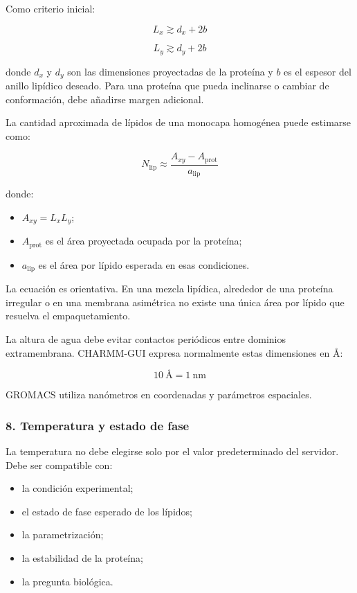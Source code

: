 \documentclass[
  spanish,
  11pt,
  a4paper]{article}
\providecommand{\tightlist}{%
  \setlength{\itemsep}{0pt}\setlength{\parskip}{0pt}}
\begin{document}
Como criterio inicial:

\[
L_x \gtrsim d_x + 2b
\]

\[
L_y \gtrsim d_y + 2b
\]

donde \(d_x\) y \(d_y\) son las dimensiones proyectadas de la proteína y
\(b\) es el espesor del anillo lipídico deseado. Para una proteína que
pueda inclinarse o cambiar de conformación, debe añadirse margen
adicional.

La cantidad aproximada de lípidos de una monocapa homogénea puede
estimarse como:

\[
N_{\mathrm{lip}} \approx
\frac{A_{xy}-A_{\mathrm{prot}}}
     {a_{\mathrm{lip}}}
\]

donde:

\begin{itemize}
\tightlist
\item
  \(A_{xy}=L_xL_y\);
\item
  \(A_{\mathrm{prot}}\) es el área proyectada ocupada por la proteína;
\item
  \(a_{\mathrm{lip}}\) es el área por lípido esperada en esas
  condiciones.
\end{itemize}

La ecuación es orientativa. En una mezcla lipídica, alrededor de una
proteína irregular o en una membrana asimétrica no existe una única área
por lípido que resuelva el empaquetamiento.

La altura de agua debe evitar contactos periódicos entre dominios
extramembrana. CHARMM-GUI expresa normalmente estas dimensiones en Å:

\[
10\ \text{Å}=1\ \text{nm}
\]

GROMACS utiliza nanómetros en coordenadas y parámetros espaciales.

\subsubsection{8. Temperatura y estado de
fase}\label{temperatura-y-estado-de-fase}

La temperatura no debe elegirse solo por el valor predeterminado del
servidor. Debe ser compatible con:

\begin{itemize}
\tightlist
\item
  la condición experimental;
\item
  el estado de fase esperado de los lípidos;
\item
  la parametrización;
\item
  la estabilidad de la proteína;
\item
  la pregunta biológica.
\end{itemize}
\end{document}
